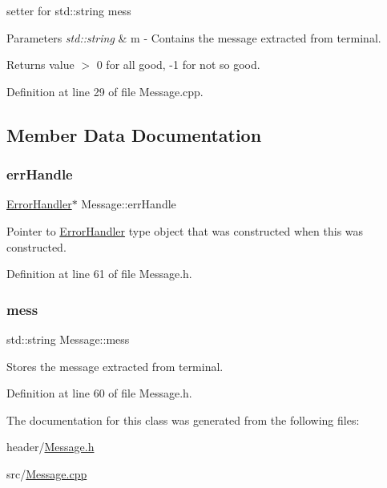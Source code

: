 setter for std\+::string mess 


\begin{DoxyParams}{Parameters}
{\em std\+::string} & m -\/ Contains the message extracted from terminal. \\
\hline
\end{DoxyParams}
\begin{DoxyReturn}{Returns}
value $>$ 0 for all good, -\/1 for not so good. 
\end{DoxyReturn}


Definition at line 29 of file Message.\+cpp.



\subsection{Member Data Documentation}
\mbox{\label{classMessage_a1052f94ece434575f0f783bc8ed3269e}} 
\subsubsection{\texorpdfstring{errHandle}{errHandle}}
{\footnotesize\ttfamily \mbox{\hyperlink{classErrorHandler}{Error\+Handler}}$\ast$ Message\+::err\+Handle\hspace{0.3cm}{\ttfamily [private]}}

Pointer to \mbox{\hyperlink{classErrorHandler}{Error\+Handler}} type object that was constructed when this was constructed. 

Definition at line 61 of file Message.\+h.

\mbox{\label{classMessage_a71af4fd1655feab5f4986782f9c1bc92}} 
\subsubsection{\texorpdfstring{mess}{mess}}
{\footnotesize\ttfamily std\+::string Message\+::mess\hspace{0.3cm}{\ttfamily [private]}}

Stores the message extracted from terminal. 

Definition at line 60 of file Message.\+h.



The documentation for this class was generated from the following files\+:\begin{DoxyCompactItemize}
\item 
header/\mbox{\hyperlink{Message_8h}{Message.\+h}}\item 
src/\mbox{\hyperlink{Message_8cpp}{Message.\+cpp}}\end{DoxyCompactItemize}
